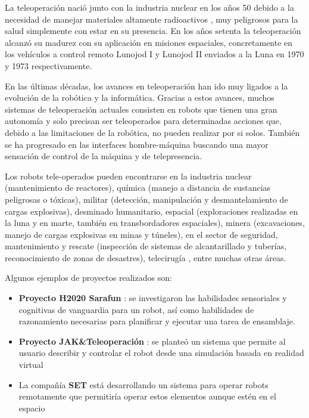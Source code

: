 
La teleoperación nació junto con la industria nuclear en los años 50 debido a la necesidad de manejar materiales altamente radioactivos , muy peligrosos para la salud simplemente con estar en su presencia. 
En los años setenta la teleoperación alcanzó su madurez con su aplicación en misiones espaciales, concretamente en los vehículos a control remoto Lunojod I y Lunojod II enviados a la Luna en 1970 y 1973 respectivamente.

En las últimas décadas, los avances en teleoperación han ido muy ligados a la evolución de la robótica y la informática. Gracias a estos avances, muchos sistemas de teleoperación actuales consisten en robots que tienen una gran autonomía y solo precisan ser teleoperados para determinadas acciones que, debido a las limitaciones de la robótica, no pueden realizar por si solos. También se ha progresado en las interfaces hombre-máquina buscando una mayor sensación de control de la máquina y de telepresencia.

Los robots tele-operados pueden encontrarse en la industria nuclear (mantenimiento de reactores), química (manejo a distancia de sustancias peligrosas o tóxicas), militar (detección, manipulación y desmantelamiento de cargas explosivas), desminado humanitario, espacial (exploraciones realizadas en la luna y en marte, también en transbordadores espaciales), minera (excavaciones, manejo de cargas explosivas en minas y túneles), en el sector de seguridad, mantenimiento y rescate (inspección de sistemas de alcantarillado y tuberías, reconocimiento de zonas de desastres), telecirugía , entre muchas otras áreas.

\newpage
Algunos ejemplos de proyectos realizados son:
\begin{itemize}
    \item \textbf{Proyecto H2020 Sarafun}\cite{Sarafun} : se investigaron las habilidades sensoriales y cognitivas de vanguardia para un robot, así como habilidades de razonamiento necesarias para planificar y ejecutar una tarea de ensamblaje.
    \item \textbf{Proyecto JAK\&Teleoperación}\cite{JAK} : se planteó un sistema que permite al usuario describir y controlar el robot desde una simulación basada en realidad virtual
    \item La compañía \textbf{SET}\cite{Set}  está desarrollando un sistema para operar robots remotamente que permitiría operar estos elementos aunque estén en el espacio
\end{itemize}
